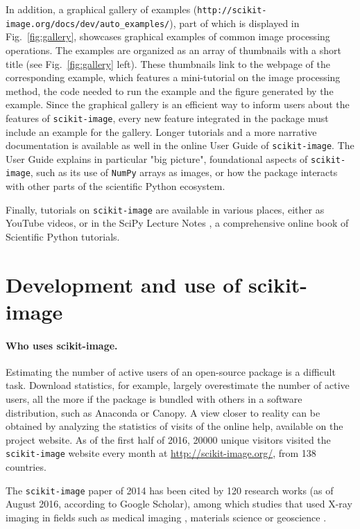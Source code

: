 \documentclass[twocolumn]{bmcart}%
\begin{document}
In addition, a graphical gallery of examples
(\nolinkurl{http://scikit-image.org/docs/dev/auto_examples/}), part of
which is displayed in Fig.~\ref{fig:gallery}, showcases graphical
examples of common image processing operations.  The examples are
organized as an array of thumbnails with a short title (see
Fig.~\ref{fig:gallery} left). These thumbnails link to the webpage of the
corresponding example, which features a mini-tutorial on the image
processing method, the code needed to run the example and the figure
generated by the example. Since the graphical gallery is an efficient way
to inform users about the features of \texttt{scikit-image}, every new
feature integrated in the package must include an example for the
gallery. Longer tutorials and a more narrative documentation is available
as well in the online User Guide of \texttt{scikit-image}. The User Guide
explains in particular "big picture", foundational aspects of
\texttt{scikit-image}, such as its use of \texttt{NumPy} arrays as
images, or how the package interacts with other parts of the scientific
Python ecosystem.

Finally, tutorials on \texttt{scikit-image} are available in various
places, either as YouTube videos, or in the SciPy Lecture
Notes \citep{scipylecturenotes}, a comprehensive online book of Scientific
Python tutorials.  

\section*{Development and use of scikit-image}

\paragraph{Who uses scikit-image.}

Estimating the number of active users of an open-source package is a
difficult task. Download statistics, for example, largely
overestimate the number of active users, all the more if the package is
bundled with others in a software distribution, such as Anaconda or
Canopy. A view closer to reality can be obtained by analyzing the
statistics of visits of the online help, available on the project
website.  As of the first half of 2016, 20000 unique visitors visited the
\texttt{scikit-image} website every month at
\url{http://scikit-image.org/}, from 138 countries.

The \texttt{scikit-image} paper of 2014 has been cited by 120 research
works (as of August 2016, according to Google Scholar), among which
studies that used X-ray imaging in fields such as medical imaging
\citep{Shen2015, Malan2016, Blackledge2016}, materials science
\citep{Bouttes2015} or geoscience \citep{Schluter2014}.
\end{document}
